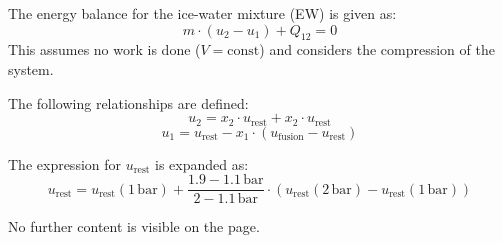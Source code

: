 The energy balance for the ice-water mixture (EW) is given as:  
\[
m \cdot (u_2 - u_1) + Q_{12} = 0
\]  
This assumes no work is done (\( V = \text{const} \)) and considers the compression of the system.  

The following relationships are defined:  
\[
u_2 = x_2 \cdot u_{\text{rest}} + x_2 \cdot u_{\text{rest}}
\]  
\[
u_1 = u_{\text{rest}} - x_1 \cdot (u_{\text{fusion}} - u_{\text{rest}})
\]  

The expression for \( u_{\text{rest}} \) is expanded as:  
\[
u_{\text{rest}} = u_{\text{rest}}(1 \, \text{bar}) + \frac{1.9 - 1.1 \, \text{bar}}{2 - 1.1 \, \text{bar}} \cdot (u_{\text{rest}}(2 \, \text{bar}) - u_{\text{rest}}(1 \, \text{bar}))
\]  

No further content is visible on the page.